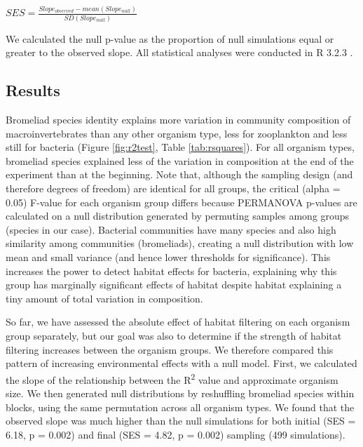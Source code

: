 \(SES = \frac{Slope_{observed} - mean(Slope_{null})}{SD(Slope_{null})}\)

We calculated the null p-value as the proportion of null simulations
equal or greater to the observed slope. All statistical analyses were
conducted in R 3.2.3 \citep{rcore}.

\subsection{Results}\label{results}

Bromeliad species identity explains more variation in community
composition of macroinvertebrates than any other organism type, less for
zooplankton and less still for bacteria (Figure \ref{fig:r2test}, Table \ref{tab:rsquares}). For all
organism types, bromeliad species explained less of the variation in
composition at the end of the experiment than at the beginning. Note
that, although the sampling design (and therefore degrees of freedom)
are identical for all groups, the critical (alpha = 0.05) F-value for
each organism group differs because PERMANOVA p-values are calculated on
a null distribution generated by permuting samples among groups (species
in our case). Bacterial communities have many species and also high
similarity among communities (bromeliads), creating a null distribution
with low mean and small variance (and hence lower thresholds for
significance). This increases the power to detect habitat effects for
bacteria, explaining why this group has marginally significant effects
of habitat despite habitat explaining a tiny amount of total variation
in composition.

So far, we have assessed the absolute effect of habitat filtering on
each organism group separately, but our goal was also to determine if
the strength of habitat filtering increases between the organism groups.
We therefore compared this pattern of increasing environmental effects
with a null model. First, we calculated the slope of the relationship
between the R\textsuperscript{2} value and approximate organism size. We
then generated null distributions by reshuffling bromeliad species
within blocks, using the same permutation across all organism types. We
found that the observed slope was much higher than the null simulations
for both initial (SES = 6.18, p = 0.002) and final (SES = 4.82, p =
0.002) sampling (499 simulations).


